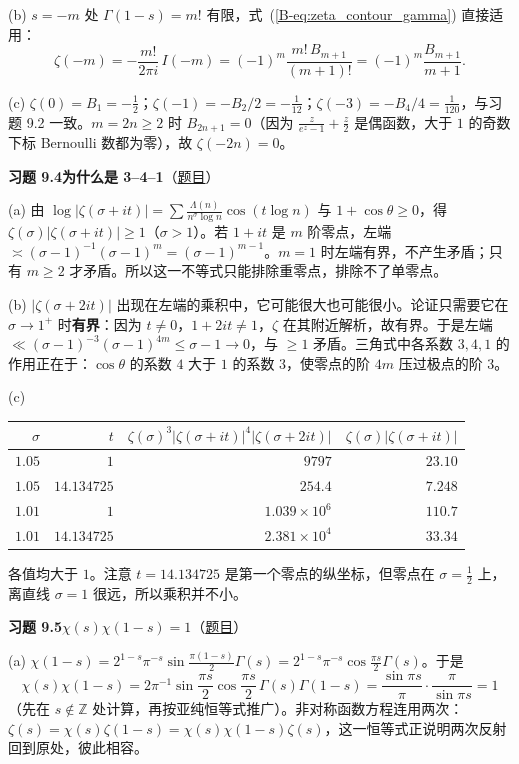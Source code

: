 \documentclass[11pt,a4paper]{article}
\newcommand{\bref}[1]{\ref*{B-#1}}
\newcommand{\Sol}[2]{%
  \par\addvspace{1.2em}\noindent
  \hypertarget{s:#1}{}\textbf{习题 #1\quad #2}\hfill{\small（\hyperlink{q:#1}{题目}）}\par
  \nopagebreak\smallskip}
\begin{document}
(b) $s=-m$ 处 $\Gamma(1-s)=m!$ 有限，式~(\bref{eq:zeta_contour_gamma}) 直接适用：
\[
  \zeta(-m)=-\frac{m!}{2\pi i}\,I(-m)=(-1)^m\frac{m!\,B_{m+1}}{(m+1)!}=(-1)^m\frac{B_{m+1}}{m+1}.
\]

(c) $\zeta(0)=B_1=-\tfrac12$；$\zeta(-1)=-B_2/2=-\tfrac1{12}$；$\zeta(-3)=-B_4/4=\tfrac1{120}$，与习题 9.2 一致。$m=2n\ge2$ 时 $B_{2n+1}=0$（因为 $\frac z{e^z-1}+\frac z2$ 是偶函数，大于 $1$ 的奇数下标 Bernoulli 数都为零），故 $\zeta(-2n)=0$。

\Sol{9.4}{为什么是 3--4--1}
(a) 由 $\log|\zeta(\sigma+it)|=\sum\frac{\Lambda(n)}{n^\sigma\log n}\cos(t\log n)$ 与 $1+\cos\theta\ge0$，得 $\zeta(\sigma)|\zeta(\sigma+it)|\ge1$（$\sigma>1$）。若 $1+it$ 是 $m$ 阶零点，左端 $\asymp(\sigma-1)^{-1}(\sigma-1)^m=(\sigma-1)^{m-1}$。$m=1$ 时左端有界，不产生矛盾；只有 $m\ge2$ 才矛盾。所以这一不等式只能排除重零点，排除不了单零点。

(b) $|\zeta(\sigma+2it)|$ 出现在左端的乘积中，它可能很大也可能很小。论证只需要它在 $\sigma\to1^+$ 时\textbf{有界}：因为 $t\ne0$，$1+2it\ne1$，$\zeta$ 在其附近解析，故有界。于是左端 $\ll(\sigma-1)^{-3}(\sigma-1)^{4m}\le\sigma-1\to0$，与 $\ge1$ 矛盾。三角式中各系数 $3,4,1$ 的作用正在于：$\cos\theta$ 的系数 $4$ 大于 $1$ 的系数 $3$，使零点的阶 $4m$ 压过极点的阶 $3$。

(c)
\begin{center}
\begin{tabular}{rrrr}
\toprule
$\sigma$ & $t$ & $\zeta(\sigma)^3|\zeta(\sigma+it)|^4|\zeta(\sigma+2it)|$ & $\zeta(\sigma)|\zeta(\sigma+it)|$\\
\midrule
$1.05$ & $1$ & $9797$ & $23.10$\\
$1.05$ & $14.134725$ & $254.4$ & $7.248$\\
$1.01$ & $1$ & $1.039\times10^6$ & $110.7$\\
$1.01$ & $14.134725$ & $2.381\times10^4$ & $33.34$\\
\bottomrule
\end{tabular}
\end{center}
各值均大于 $1$。注意 $t=14.134725$ 是第一个零点的纵坐标，但零点在 $\sigma=\tfrac12$ 上，离直线 $\sigma=1$ 很远，所以乘积并不小。

\Sol{9.5}{$\chi(s)\chi(1-s)=1$}
(a) $\chi(1-s)=2^{1-s}\pi^{-s}\sin\frac{\pi(1-s)}2\Gamma(s)=2^{1-s}\pi^{-s}\cos\frac{\pi s}2\Gamma(s)$。于是
\[
  \chi(s)\chi(1-s)=2\pi^{-1}\sin\frac{\pi s}2\cos\frac{\pi s}2\,\Gamma(s)\Gamma(1-s)=\frac{\sin\pi s}{\pi}\cdot\frac{\pi}{\sin\pi s}=1
\]
（先在 $s\notin\mathbb Z$ 处计算，再按亚纯恒等式推广）。非对称函数方程连用两次：$\zeta(s)=\chi(s)\zeta(1-s)=\chi(s)\chi(1-s)\zeta(s)$，这一恒等式正说明两次反射回到原处，彼此相容。
\end{document}
